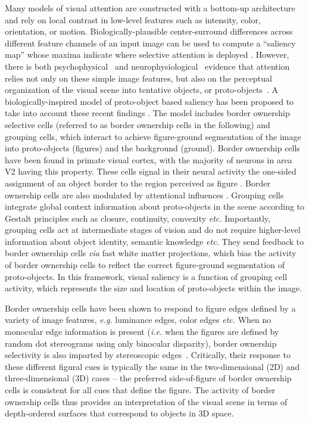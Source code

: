 \documentclass[12pt]{article}
\newcommand{\ie}[0]{{\em i.e.}\xspace}
\newcommand{\eg}[0]{{\em e.g.}\xspace}
\newcommand{\etc}[0]{{\em etc.}\xspace}
\newcommand{\via}[0]{{\em via}\xspace}
\begin{document}
Many models of visual attention are constructed with a bottom-up
architecture and rely on local contrast in low-level features such as
intensity, color, orientation, or motion. Biologically-plausible
center-surround differences across different feature channels of an
input image can be used to compute a ``saliency map'' whose maxima
indicate where selective attention is deployed
\citep{Koch_Ullman85,Niebur_Koch96b,Itti_etal98a}. However, there is
both psychophysical~\citep{Einhauser_etal08a} and
neurophysiological~\citep{Zhou_etal00, Qiu_etal07} evidence that
attention relies not only on these simple image features, but also on
the perceptual organization of the visual scene into tentative
objects, or proto-objects~\citep{Rensink00a}.  A biologically-inspired
model of proto-object based saliency has been proposed to take into
account these recent findings
\citep{Craft_etal07,Mihalas_etal11b,Russell_etal14}. The model
includes border ownership selective cells (referred to as border
ownership cells in the following) and grouping cells, which interact
to achieve figure-ground segmentation of the image into proto-objects
(figures) and the background (ground). Border ownership cells have
been found in primate visual cortex, with the majority of neurons in
area V2 having this property. These cells signal in their neural
activity the one-sided assignment of an object border to the region
perceived as figure \citep{Zhou_etal00}.  Border ownership cells are
also modulated by attentional influences \citep{Qiu_etal07}. Grouping
cells integrate global context information about proto-objects in the
scene according to Gestalt principles such as closure, continuity,
convexity \etc Importantly, grouping cells act at intermediate stages
of vision and do not require higher-level information about object
identity, semantic knowledge \etc They send feedback to border
ownership cells \via fast white matter projections, which bias the
activity of border ownership cells to reflect the correct
figure-ground segmentation of proto-objects. In this framework, visual
saliency is a function of grouping cell activity, which represents the
size and location of proto-objects within the image.

Border ownership cells have been shown to respond to figure edges
defined by a variety of image features, \eg luminance edges, color
edges \etc When no monocular edge information is present (\ie when the
figures are defined by random dot stereograms using only binocular
disparity), border ownership selectivity is also
imparted by stereoscopic edges~\citep{Qiu_vonderHeydt05}.
Critically, their response to these different figural cues is
typically the same in the two-dimensional (2D) and three-dimensional
(3D) cases -- the preferred side-of-figure of border ownership cells
is consistent for all cues that define the figure. The activity of
border ownership cells thus provides an interpretation of the visual
scene in terms of depth-ordered surfaces that correspond to objects in
3D space. 
\end{document}
